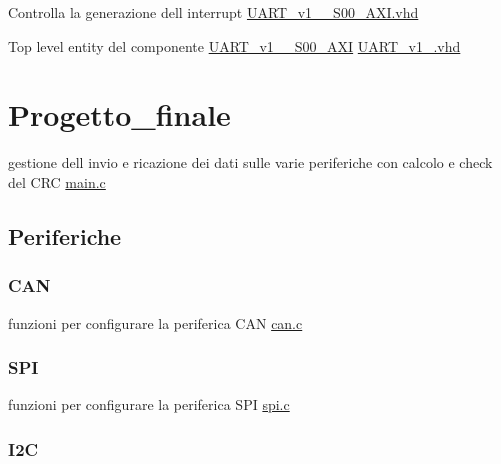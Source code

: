 \begin{DoxyItemize}
\item Controlla la generazione dell\textquotesingle{} interrupt \hyperlink{UART__v1__0__S00__AXI_8vhd}{U\+A\+R\+T\+\_\+v1\+\_\+\_\+\+S00\+\_\+\+A\+X\+I.\+vhd}
\item Top level entity del componente \hyperlink{classUART__v1__0__S00__AXI}{U\+A\+R\+T\+\_\+v1\+\_\+\_\+\+S00\+\_\+\+A\+XI} \hyperlink{UART__v1__0_8vhd}{U\+A\+R\+T\+\_\+v1\+\_.\+vhd} 
\end{DoxyItemize}\hypertarget{index_Progetto_finale}{}\section{Progetto\+\_\+finale}\label{index_Progetto_finale}

\begin{DoxyItemize}
\item gestione dell\textquotesingle{} invio e ricazione dei dati sulle varie periferiche con calcolo e check del C\+RC \hyperlink{main_8c}{main.\+c} 
\end{DoxyItemize}\hypertarget{index_Periferiche}{}\subsection{Periferiche}\label{index_Periferiche}
\hypertarget{index_CAN}{}\subsubsection{C\+AN}\label{index_CAN}

\begin{DoxyItemize}
\item funzioni per configurare la periferica C\+AN \hyperlink{can_8c}{can.\+c} 
\end{DoxyItemize}\hypertarget{index_SPI}{}\subsubsection{S\+PI}\label{index_SPI}

\begin{DoxyItemize}
\item funzioni per configurare la periferica S\+PI \hyperlink{spi_8c}{spi.\+c} 
\end{DoxyItemize}\hypertarget{index_I2C}{}\subsubsection{I2C}\label{index_I2C}

